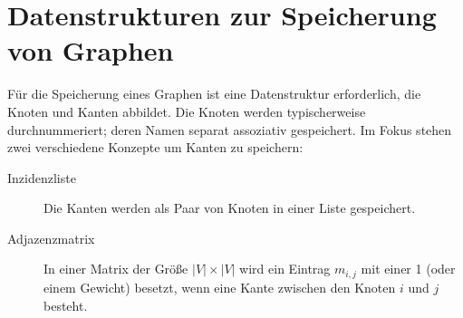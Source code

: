 \section{Datenstrukturen zur Speicherung von Graphen}
%
Für die Speicherung eines Graphen ist eine Datenstruktur erforderlich, die Knoten und Kanten abbildet. Die Knoten werden typischerweise durchnummeriert; deren Namen separat assoziativ gespeichert. Im Fokus stehen zwei verschiedene Konzepte um Kanten zu speichern:
%
\begin{description}
  \item[Inzidenzliste]
    Die Kanten werden als Paar von Knoten in einer Liste gespeichert.
  \item[Adjazenzmatrix]
    In einer Matrix der Größe $|V|\times |V|$ wird ein Eintrag $m_{i,j}$ mit einer 1 (oder einem Gewicht) besetzt,
    wenn eine Kante zwischen den Knoten $i$ und $j$ besteht.
\end{description}
